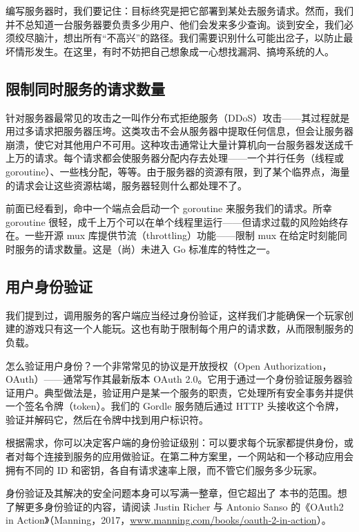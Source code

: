 编写服务器时，我们要记住：目标终究是把它部署到某处去服务请求。然而，我们并不总知道一台服务器要负责多少用户、他们会发来多少查询。谈到安全，我们必须绞尽脑汁，想出所有``不高兴''的路径。我们需要识别什么可能出岔子，以防止最坏情形发生。在这里，有时不妨把自己想象成一心想找漏洞、搞垮系统的人。

\subsection{限制同时服务的请求数量}

针对服务器最常见的攻击之一叫作分布式拒绝服务（DDoS）攻击——其过程就是用过多请求把服务器压垮。这类攻击不会从服务器中提取任何信息，但会让服务器崩溃，使它对其他用户不可用。这种攻击通常让大量计算机向一台服务器发送成千上万的请求。每个请求都会使服务器分配内存去处理——一个并行任务（线程或 goroutine）、一些栈分配，等等。由于服务器的资源有限，到了某个临界点，海量的请求会让这些资源枯竭，服务器轻则什么都处理不了。

前面已经看到，命中一个端点会启动一个 goroutine 来服务我们的请求。所幸 goroutine 很轻，成千上万个可以在单个线程里运行——但请求过载的风险始终存在。一些开源 mux 库提供节流（throttling）功能——限制 mux 在给定时刻能同时服务的请求数量。这是（尚）未进入 Go 标准库的特性之一。

\subsection{用户身份验证}

我们提到过，调用服务的客户端应当经过身份验证，这样我们才能确保一个玩家创建的游戏只有这一个人能玩。这也有助于限制每个用户的请求数，从而限制服务的负载。

怎么验证用户身份？一个非常常见的协议是开放授权（Open Authorization，OAuth）——通常写作其最新版本 OAuth 2.0。它用于通过一个身份验证服务器验证用户。典型做法是，验证用户是某一个服务的职责，它处理所有安全事务并提供一个签名令牌（token）。我们的 Gordle 服务随后通过 HTTP 头接收这个令牌，验证并解码它，然后在令牌中找到用户标识符。

根据需求，你可以决定客户端的身份验证级别：可以要求每个玩家都提供身份，或者对每个连接到服务的应用做验证。在第二种方案里，一个网站和一个移动应用会拥有不同的 ID 和密钥，各自有请求速率上限，而不管它们服务多少玩家。

身份验证及其解决的安全问题本身可以写满一整章，但它超出了
本书的范围。想了解更多身份验证的内容，请阅读 Justin Richer 与 Antonio Sanso 的《OAuth2 in Action》（Manning，2017，\url{www.manning.com/books/oauth-2-in-action}）。

